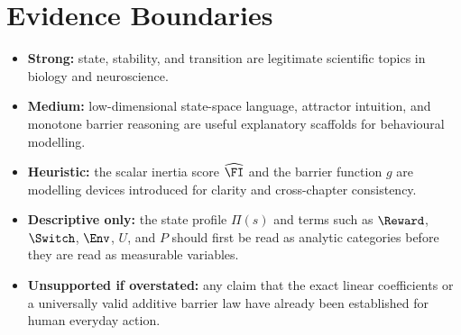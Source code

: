 \section{Evidence Boundaries}

\begin{itemize}[nosep]
  \item \textbf{Strong:} state, stability, and transition are legitimate
        scientific topics in biology and neuroscience.
  \item \textbf{Medium:} low-dimensional state-space language, attractor
        intuition, and monotone barrier reasoning are useful explanatory
        scaffolds for behavioural modelling.
  \item \textbf{Heuristic:} the scalar inertia score $\widehat{\FI}$ and the
        barrier function $g$ are modelling devices introduced for clarity and
        cross-chapter consistency.
  \item \textbf{Descriptive only:} the state profile $\Pi(s)$ and terms such as
        $\Reward$, $\Switch$, $\Env$, $U$, and $P$ should first be read as
        analytic categories before they are read as measurable variables.
  \item \textbf{Unsupported if overstated:} any claim that the exact linear
        coefficients or a universally valid additive barrier law have already
        been established for human everyday action.
\end{itemize}
